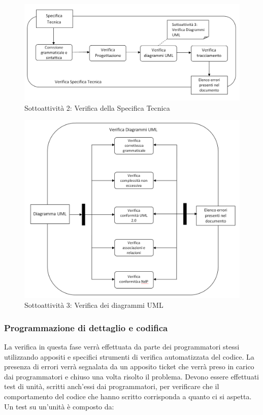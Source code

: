 \begin{figure}[h!]
	\centering
	\includegraphics[scale=.45]{img/schema_ST.png}
	\caption{Sottoattività 2: Verifica della Specifica Tecnica}
\end{figure}

\begin{figure}[h!]
	\centering
	\includegraphics[scale=.45]{img/schema_UML.png}
	\caption{Sottoattività 3: Verifica dei diagrammi UML}
\end{figure}

\subsubsection{Programmazione di dettaglio e codifica}
La verifica in questa fase verrà effettuata da parte
dei programmatori stessi utilizzando appositi e specifici strumenti di verifica automatizzata del codice. La presenza di errori verrà segnalata da un apposito ticket che verrà preso in carico dai programmatori e chiuso una volta risolto il problema.
Devono essere effettuati test di unità, scritti anch'essi dai programmatori, per verificare che il comportamento del codice che hanno scritto corrisponda a quanto ci si aspetta. Un test su un'unità è composto da:

